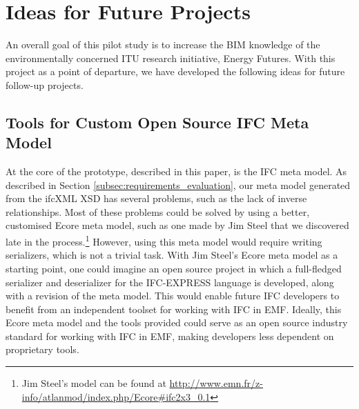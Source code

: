 
\section{Ideas for Future Projects}
\label{sec:plan_for_future_projects}
An overall goal of this pilot study is to increase the BIM knowledge of the environmentally concerned ITU research initiative, Energy Futures. With this project as a point of departure, we have developed the following ideas for future follow-up projects.

\subsection{Tools for Custom Open Source IFC Meta Model}
At the core of the prototype, described in this paper, is the IFC meta model. As described in Section \ref{subsec:requirements_evaluation}, our meta model generated from the ifcXML XSD has several problems, such as the lack of inverse relationships. Most of these problems could be solved by using a better, customised Ecore meta model, such as one made by Jim Steel that we discovered late in the process.\footnote{Jim Steel's model can be found at \url{http://www.emn.fr/z-info/atlanmod/index.php/Ecore#ifc2x3_0.1}} However, using this meta model would require writing serializers, which is not a trivial task. With Jim Steel's Ecore meta model as a starting point, one could imagine an open source project in which a full-fledged serializer and deserializer for the IFC-EXPRESS language is developed, along with a revision of the meta model. This would enable future IFC developers to benefit from an independent toolset for working with IFC in EMF. Ideally, this Ecore meta model and the tools provided could serve as an open source industry standard for working with IFC in EMF, making developers less dependent on proprietary tools.


